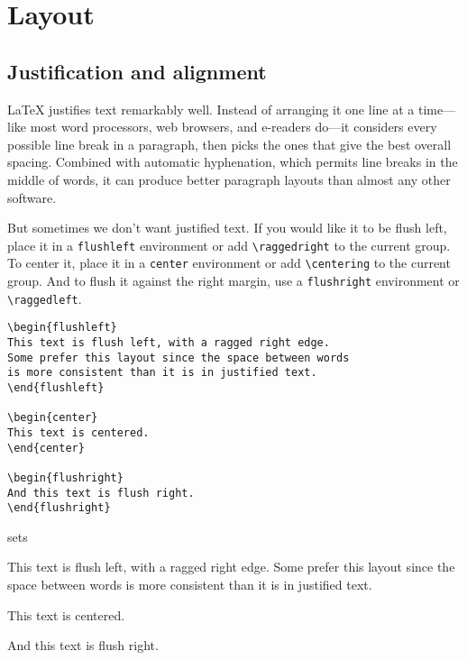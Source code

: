 \chapter{Layout}

\section{Justification and alignment}

\LaTeX{} justifies text remarkably well.
Instead of arranging it one line at a time---like most word processors,
web browsers, and e-readers do---it considers every possible line break
in a paragraph, then picks the ones that give the best overall
spacing.\punckern{}
Combined with automatic hyphenation,
which permits line breaks in the middle of words,\punckern{}
it can produce better paragraph layouts than almost any other software.

But sometimes we don't want justified text.
If you would like it to be flush left,
place it in a \texttt{flushleft} environment
or add \verb|\raggedright| to the current group.
To center it, place it in a
\texttt{center} environment or add \verb|\centering| to the current group.
And to flush it against the right margin,
use a \texttt{flushright} environment or \verb|\raggedleft|.

\begin{leftfigure}
\begin{lstlisting}
\begin{flushleft}
This text is flush left, with a ragged right edge.
Some prefer this layout since the space between words
is more consistent than it is in justified text.
\end{flushleft}

\begin{center}
This text is centered.
\end{center}

\begin{flushright}
And this text is flush right.
\end{flushright}
\end{lstlisting}
\end{leftfigure}
sets
\begin{flushleftfigure}
\begin{minipage}{0.99\textwidth}
\lm%
\begin{flushleft}
This text is flush left, with a ragged right edge.
Some prefer this layout since the space between words
is more consistent than it is in justified text.
\end{flushleft}

\begin{center}
This text is centered.
\end{center}

\begin{flushright}
And this text is flush right.
\end{flushright}
\end{minipage}
\end{flushleftfigure}

